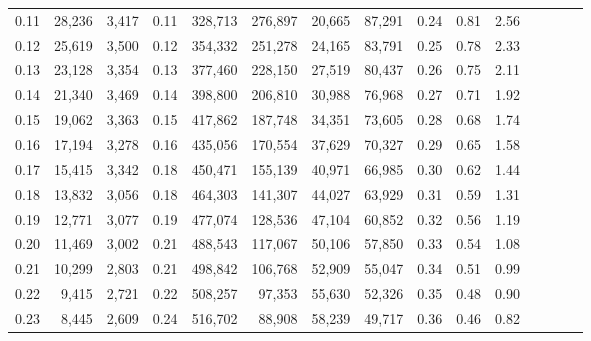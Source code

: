 \begin{tabular}{rrrcrrrrrrrrrrr}
0.11 &  28,236 &  3,417 &                                       0.11 &  328,713 &  276,897 &   20,665 &   87,291 &  0.24 &  0.81 &                         2.56 \\
0.12 &  25,619 &  3,500 &                                       0.12 &  354,332 &  251,278 &   24,165 &   83,791 &  0.25 &  0.78 &                         2.33 \\
0.13 &  23,128 &  3,354 &                                       0.13 &  377,460 &  228,150 &   27,519 &   80,437 &  0.26 &  0.75 &                         2.11 \\
0.14 &  21,340 &  3,469 &                                       0.14 &  398,800 &  206,810 &   30,988 &   76,968 &  0.27 &  0.71 &                         1.92 \\
0.15 &  19,062 &  3,363 &                                       0.15 &  417,862 &  187,748 &   34,351 &   73,605 &  0.28 &  0.68 &                         1.74 \\
0.16 &  17,194 &  3,278 &                                       0.16 &  435,056 &  170,554 &   37,629 &   70,327 &  0.29 &  0.65 &                         1.58 \\
0.17 &  15,415 &  3,342 &                                       0.18 &  450,471 &  155,139 &   40,971 &   66,985 &  0.30 &  0.62 &                         1.44 \\
0.18 &  13,832 &  3,056 &                                       0.18 &  464,303 &  141,307 &   44,027 &   63,929 &  0.31 &  0.59 &                         1.31 \\
0.19 &  12,771 &  3,077 &                                       0.19 &  477,074 &  128,536 &   47,104 &   60,852 &  0.32 &  0.56 &                         1.19 \\
0.20 &  11,469 &  3,002 &                                       0.21 &  488,543 &  117,067 &   50,106 &   57,850 &  0.33 &  0.54 &                         1.08 \\
0.21 &  10,299 &  2,803 &                                       0.21 &  498,842 &  106,768 &   52,909 &   55,047 &  0.34 &  0.51 &                         0.99 \\
0.22 &   9,415 &  2,721 &                                       0.22 &  508,257 &   97,353 &   55,630 &   52,326 &  0.35 &  0.48 &                         0.90 \\
0.23 &   8,445 &  2,609 &                                       0.24 &  516,702 &   88,908 &   58,239 &   49,717 &  0.36 &  0.46 &                         0.82 \\

\end{tabular}
